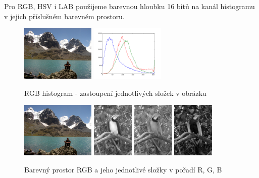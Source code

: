 \documentclass[czech,BP]{thesiskiv}
\begin{document}
Pro RGB, HSV i LAB použijeme barevnou hloubku 16 bitů na kanál histogramu v jejich příslušném barevném prostoru. 

\begin{figure}[ht]
		\centering
		\includegraphics[height=100px]{./img/img_histogram.jpg}	
		\includegraphics[height=100px]{./img/bgr_histogram.png}	
		\caption{RGB histogram - zastoupení jednotlivých složek v obrázku}
\end{figure}

\begin{figure}[ht]
		\centering
		\includegraphics[height=100px]{./img/img_histogram.jpg}
		\includegraphics[height=100px]{./img/bgr_r.jpg}
		\includegraphics[height=100px]{./img/bgr_g.jpg}
		\includegraphics[height=100px]{./img/bgr_b.jpg}	
		\caption{Barevný prostor RGB a jeho jednotlivé složky v pořadí R, G, B}
\end{figure}
\end{document}
